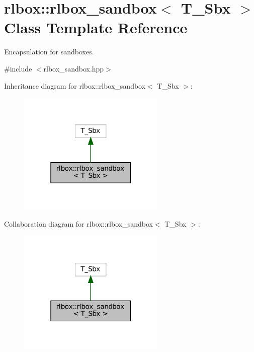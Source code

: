 \hypertarget{classrlbox_1_1rlbox__sandbox}{}\section{rlbox\+:\+:rlbox\+\_\+sandbox$<$ T\+\_\+\+Sbx $>$ Class Template Reference}
\label{classrlbox_1_1rlbox__sandbox}


Encapsulation for sandboxes.  




{\ttfamily \#include $<$rlbox\+\_\+sandbox.\+hpp$>$}



Inheritance diagram for rlbox\+:\+:rlbox\+\_\+sandbox$<$ T\+\_\+\+Sbx $>$\+:\nopagebreak
\begin{figure}[H]
\begin{center}
\leavevmode
\includegraphics[width=199pt]{classrlbox_1_1rlbox__sandbox__inherit__graph}
\end{center}
\end{figure}


Collaboration diagram for rlbox\+:\+:rlbox\+\_\+sandbox$<$ T\+\_\+\+Sbx $>$\+:\nopagebreak
\begin{figure}[H]
\begin{center}
\leavevmode
\includegraphics[width=199pt]{classrlbox_1_1rlbox__sandbox__coll__graph}
\end{center}
\end{figure}
